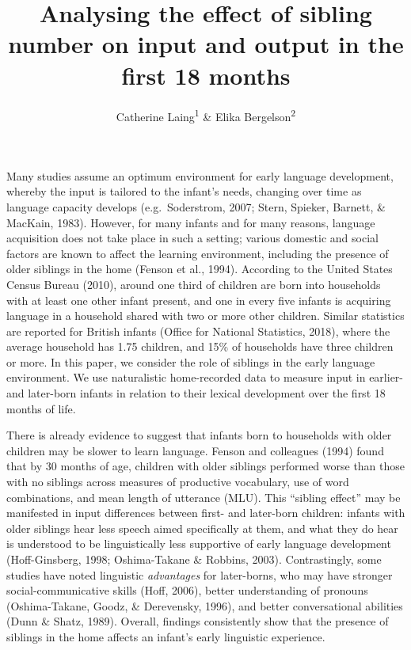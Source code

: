 \documentclass[
  english,
  man,floatsintext]{apa6}
\title{Analysing the effect of sibling number on input and output in the first 18 months}
\author{Catherine Laing\textsuperscript{1} \& Elika Bergelson\textsuperscript{2}}
\date{}
\affiliation{\vspace{0.5cm}\textsuperscript{1} University of York, York, UK\\\textsuperscript{2} Duke University, Durham, NC, USA}
\begin{document}
\maketitle

Many studies assume an optimum environment for early language development, whereby the input is tailored to the infant's needs, changing over time as language capacity develops (e.g.~Soderstrom, 2007; Stern, Spieker, Barnett, \& MacKain, 1983). However, for many infants and for many reasons, language acquisition does not take place in such a setting; various domestic and social factors are known to affect the learning environment, including the presence of older siblings in the home (Fenson et al., 1994). According to the United States Census Bureau (2010), around one third of children are born into households with at least one other infant present, and one in every five infants is acquiring language in a household shared with two or more other children. Similar statistics are reported for British infants (Office for National Statistics, 2018), where the average household has 1.75 children, and 15\% of households have three children or more. In this paper, we consider the role of siblings in the early language environment. We use naturalistic home-recorded data to measure input in earlier- and later-born infants in relation to their lexical development over the first 18 months of life.

There is already evidence to suggest that infants born to households with older children may be slower to learn language. Fenson and colleagues (1994) found that by 30 months of age, children with older siblings performed worse than those with no siblings across measures of productive vocabulary, use of word combinations, and mean length of utterance (MLU). This \enquote{sibling effect} may be manifested in input differences between first- and later-born children: infants with older siblings hear less speech aimed specifically at them, and what they do hear is understood to be linguistically less supportive of early language development (Hoff-Ginsberg, 1998; Oshima-Takane \& Robbins, 2003). Contrastingly, some studies have noted linguistic \emph{advantages} for later-borns, who may have stronger social-communicative skills (Hoff, 2006), better understanding of pronouns (Oshima-Takane, Goodz, \& Derevensky, 1996), and better conversational abilities (Dunn \& Shatz, 1989). Overall, findings consistently show that the presence of siblings in the home affects an infant's early linguistic experience.
\end{document}
